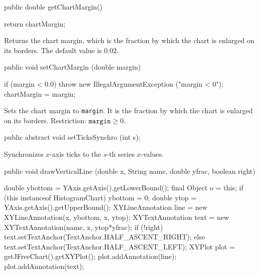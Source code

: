 \begin{htmlonly}
\end{htmlonly}
\begin{code}

   public double getChartMargin() \begin{hide} {
      return chartMargin;
   }\end{hide}
\end{code}
\begin{tabb}
    Returns the chart margin, which is the fraction by which the chart
    is enlarged on its borders. The default value is $0.02$.
\end{tabb}
\begin{code}

   public void setChartMargin (double margin) \begin{hide} {
      if (margin < 0.0)
         throw new IllegalArgumentException ("margin < 0");
      chartMargin = margin;
   }\end{hide}
\end{code}
\begin{tabb}
    Sets the chart margin to \texttt{margin}. It is the fraction by
    which the chart is enlarged on its borders.
   Restriction: $\texttt{margin} \ge 0$.
\end{tabb}
\begin{htmlonly}
\end{htmlonly}
\begin{code}

   public abstract void setTicksSynchro (int s);
\end{code}
\begin{tabb}
   Synchronizes $x$-axis ticks to the $s$-th series $x$-values.
\end{tabb}
\begin{htmlonly}
\end{htmlonly}
\begin{code}

   public void drawVerticalLine (double x, String name, double yfrac,
                                 boolean right) \begin{hide} {
      double ybottom = YAxis.getAxis().getLowerBound();
      final Object o = this;
      if (this instanceof HistogramChart)
         ybottom = 0;
      double ytop = YAxis.getAxis().getUpperBound();
      XYLineAnnotation line = new XYLineAnnotation(x, ybottom, x, ytop);
      XYTextAnnotation text = new XYTextAnnotation(name, x, ytop*yfrac);
      if (!right)
         text.setTextAnchor(TextAnchor.HALF_ASCENT_RIGHT);
      else
         text.setTextAnchor(TextAnchor.HALF_ASCENT_LEFT);
      XYPlot plot = getJFreeChart().getXYPlot();
      plot.addAnnotation(line);
      plot.addAnnotation(text);
   }\end{hide}
\end{code}
